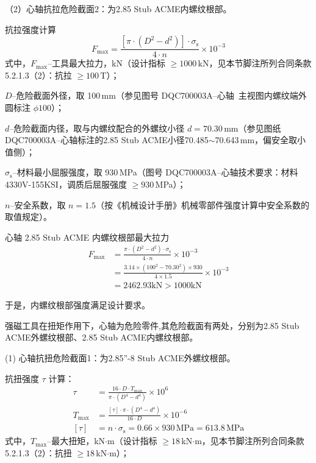 （2）心轴抗拉危险截面2：为2.85 Stub ACME内螺纹根部。

抗拉强度计算
\begin{equation}
    F_{\max} = \frac{[\pi \cdot (D^2 - d^2)] \cdot \sigma_{\mathrm{s}}}{4 \cdot n} \times 10^{-3}
\end{equation}
式中，$F_{\max}$--工具最大拉力，kN（设计指标 $\ge 1000$\,kN，见本节脚注所列合同条款 5.2.1.3（2）：抗拉 $\ge 100$\,T）；

$D$--危险截面外径，取 100\,mm（参见图号 DQC700003A--心轴\ 主视图内螺纹端外圆标注 $\phi 100$）；

$d$--危险截面内径，取与内螺纹配合的外螺纹小径 $d = 70.30\,\text{mm}$（参见图纸DQC700003A--心轴标注的2.85 Stub ACME小径70.485$\sim$70.643\,mm，偏安全取小值侧）；

$\sigma_{\mathrm{s}}$--材料最小屈服强度，取 930\,MPa（图号 DQC700003A--心轴技术要求：材料 4330V-155KSI，调质后屈服强度 $\ge 930$\,MPa）；

$n$--安全系数，取 $n = 1.5$（按《机械设计手册》机械零部件强度计算中安全系数的取值规定\cite{ref26}）。

心轴 2.85 Stub ACME 内螺纹根部最大拉力
\begin{equation}
    \begin{aligned}
        F_{\max} &= \frac{\pi \cdot (D^2 - d^2) \cdot \sigma_{\mathrm{s}}}{4 \cdot n} \times 10^{-3} \\
                 &= \frac{3.14 \times (100^2 - 70.30^2) \times 930}{4 \times 1.5} \times 10^{-3} \\
                 &= 2462.93 \text{kN} > 1000 \text{kN}
    \end{aligned}
\end{equation}

于是，内螺纹根部强度满足设计要求。


强磁工具在扭矩作用下，心轴为危险零件,其危险截面有两处，分别为2.85 Stub ACME外螺纹根部、2.85 Stub ACME内螺纹根部。

(1)	心轴抗扭危险截面1：为2.85”-8 Stub ACME外螺纹根部。

抗扭强度 $\tau$ 计算：
\begin{equation}
\begin{aligned}
    \tau &= \frac{16 \cdot D \cdot T_{\max}}{\pi \cdot (D^4 - d^4)} \times 10^6 \\
    T_{\max} &= \frac{[\tau] \cdot \pi \cdot (D^4 - d^4)}{16 \cdot D} \times 10^{-6} \\
    [\tau] &= n \cdot \sigma_{\mathrm{s}} = 0.66 \times 930\,\text{MPa} = 613.8\,\text{MPa}
\end{aligned}
\end{equation}
式中，$T_{\max}$--最大扭矩，kN$\cdot$m（设计指标 $\ge 18$\,kN$\cdot$m，见本节脚注所列合同条款 5.2.1.3（2）：抗扭 $\ge 18$\,kN$\cdot$m）；

